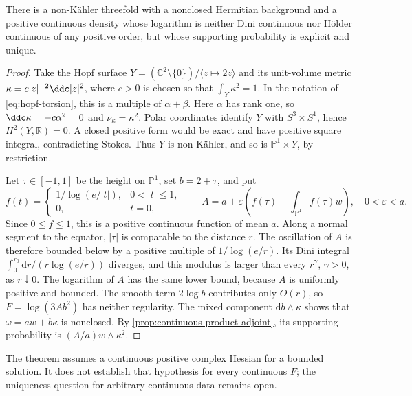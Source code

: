 \begin{example}\label{ex:non-dini-hopf-product-adjoint}
There is a non-K\"ahler threefold with a nonclosed Hermitian background
and a positive continuous density whose logarithm is neither Dini
continuous nor H\"older continuous of any positive order, but whose
supporting probability is explicit and unique.
\end{example}
\begin{proof}
Take the Hopf surface
$Y=(\mathbb C^2\setminus\{0\})/\langle z\mapsto2z\rangle$ and its
unit-volume metric $\kappa=c|z|^{-2}\ddc|z|^2$, where $c>0$ is chosen
so that $\int_Y\kappa^2=1$. In the notation of
\eqref{eq:hopf-torsion}, this is a multiple of $\alpha+\beta$.
Here $\alpha$ has rank one, so $\ddc\kappa=-c\alpha^2=0$ and
$\nu_\kappa=\kappa^2$. Polar coordinates identify $Y$ with
$S^3\times S^1$, hence $H^2(Y,\mathbb R)=0$. A closed positive form
would be exact and have positive square integral, contradicting Stokes.
Thus $Y$ is non-K\"ahler, and so is $\mathbb P^1\times Y$, by restriction.

Let $\tau\in[-1,1]$ be the height on $\mathbb P^1$, set $b=2+\tau$,
and put
\[
 f(t)=\begin{cases}
       1/\log(e/|t|),&0<|t|\leq1,\\
       0,&t=0,
      \end{cases}
 \qquad
 A=a+\varepsilon\left(f(\tau)-\int_{\mathbb P^1}f(\tau)w\right),
 \quad0<\varepsilon<a.
\]
Since $0\leq f\leq1$, this is a positive continuous function of mean
$a$. Along a normal segment to the equator, $|\tau|$ is comparable
to the distance $r$. The oscillation of $A$ is therefore bounded below
by a positive multiple of $1/\log(e/r)$. Its Dini integral
$\int_0^{r_0}\mathrm dr/(r\log(e/r))$ diverges, and this modulus is
larger than every $r^\gamma$, $\gamma>0$, as $r\downarrow0$.
The logarithm of $A$ has the same lower bound, because $A$ is uniformly
positive and bounded. The smooth term $2\log b$ contributes only $O(r)$,
so $F=\log(3Ab^2)$ has neither regularity. The mixed component
$\mathrm db\wedge\kappa$ shows that $\omega=aw+b\kappa$ is nonclosed.
By \cref{prop:continuous-product-adjoint}, its supporting probability
is $(A/a)w\wedge\kappa^2$.
\end{proof}

The theorem assumes a continuous positive complex Hessian for a bounded
solution. It does not establish that hypothesis for every continuous $F$;
the uniqueness question for arbitrary continuous data remains open.
